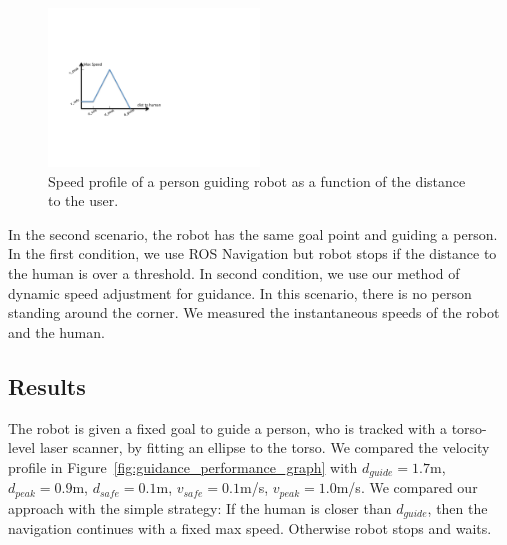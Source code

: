 \begin{figure}[ht!]
\centering
\includegraphics[width=0.5\textwidth]{pics/speed_profile_cropped}
\caption{Speed profile of a person guiding robot as a function of the distance to the user.}
\label{fig:guidance_speed_profile}
\end{figure}

In the second scenario, the robot has the same goal point and guiding a person. In the first condition, we use ROS Navigation but robot stops if the distance to the human is over a threshold. In second condition, we use our method of dynamic speed adjustment for guidance. In this scenario, there is no person standing around the corner. We measured the instantaneous speeds of the robot and the human.


\subsection{Results}
\label{sec:guidance_results}

The robot is given a fixed goal to guide a person, who is tracked with a torso-level laser scanner, by fitting an ellipse to the torso. We compared the velocity profile in Figure~\ref{fig:guidance_performance_graph} with $d_{guide}=1.7$m, $d_{peak}=0.9$m, $d_{safe}=0.1$m, $v_{safe}=0.1$m/s, $v_{peak}=1.0$m/s. We compared our approach with the simple strategy: If the human is closer than $d_{guide}$, then the navigation continues with a fixed max speed. Otherwise robot stops and waits.

